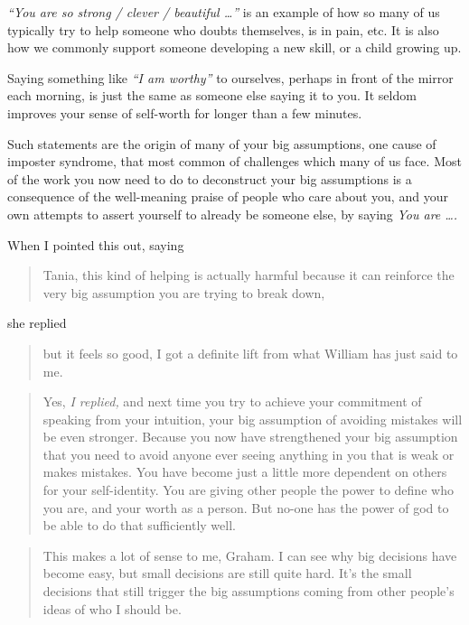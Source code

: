 \emph{“You are so strong / clever / beautiful \ldots”} is an example of how so many of us typically try to help someone who doubts themselves, is in pain, etc. It is also how we commonly support someone developing a new skill, or a child growing up. 


Saying something like \emph{“I am worthy”} to ourselves, perhaps in front of the mirror each morning, is just the same as someone else saying it to you. It seldom improves your sense of self-worth for longer than a few minutes. 


Such statements are the origin of many of your big assumptions,  one cause of imposter syndrome, that most common of challenges which many of us face. Most of the work you now need to do to deconstruct your big assumptions is a consequence of the well-meaning praise of people who care about you, and your own attempts to assert yourself to already be someone else, by saying \emph{You are \ldots .} 


\begin{longstoryblock}
When I pointed this out, saying \begin{quote}Tania, this kind of helping is actually harmful because it can reinforce the very big assumption you are trying to break down,\end{quote} she replied \begin{quote}but it feels so good, I got a definite lift from what William has just said to me.\end{quote} 


\begin{quote} Yes, \emph{I replied,} and next time you try to achieve your commitment of speaking from your intuition, your big assumption of avoiding mistakes will be even stronger. Because you now have strengthened your big assumption that you need to avoid anyone ever seeing anything in you that is weak or makes mistakes. You have become just a little more dependent on others for your self-identity. You are giving other people the power to define who you are, and your worth as a person. But no-one has the power of god to be able to do that sufficiently well.\end{quote} 


\begin{quote}This makes a lot of sense to me, Graham. I can see why big decisions have become easy, but small decisions are still quite hard. It's the small decisions that still trigger the big assumptions coming from other people's ideas of who I should be.\end{quote}
\end{longstoryblock}


